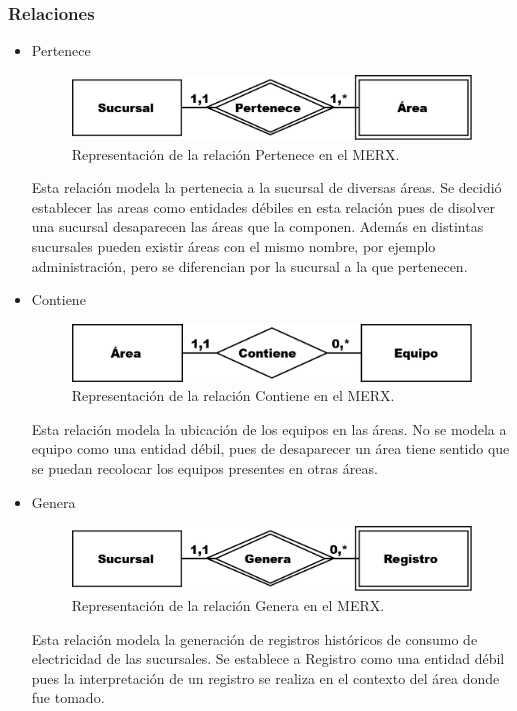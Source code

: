 \documentclass{article}
\begin{document}
\subsubsection{Relaciones}
\begin{itemize}
\item Pertenece

\begin{figure}
\includegraphics[scale=0.5]{Imagenes/Informe1/RelacionPertenece.png}
\caption{Representación de la relación Pertenece en el MERX.}
\label{relacionPertenece}
\end{figure}

Esta relación modela la pertenecia a la sucursal de diversas áreas. Se decidió establecer las areas como entidades débiles
en esta relación pues de disolver una sucursal desaparecen las áreas que la componen. Además en distintas sucursales pueden
existir áreas con el mismo nombre, por ejemplo administración, pero se diferencian por la sucursal a la que pertenecen.

\item Contiene

\begin{figure}
\includegraphics[scale=0.5]{Imagenes/Informe1/RelacionContiene.png}
\caption{Representación de la relación Contiene en el MERX.}
\label{relacionContiene}
\end{figure}

Esta relación modela la ubicación de los equipos en las áreas. No se modela a equipo como una entidad débil, pues de desaparecer un área
tiene sentido que se puedan recolocar los equipos presentes en otras áreas.

\item Genera

\begin{figure}
\includegraphics[scale=0.5]{Imagenes/Informe1/RelacionGenera.png}
\caption{Representación de la relación Genera en el MERX.}
\label{relacionGenera}
\end{figure}

Esta relación modela la generación de registros históricos de consumo de electricidad de las sucursales. Se establece a Registro como
una entidad débil pues la interpretación de un registro se realiza en el contexto del área donde fue tomado.

\end{itemize}
\end{document}
